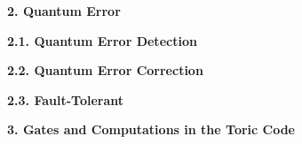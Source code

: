 \documentclass[12pt]{report}
\begin{document}
	\begin{minipage}{1 \textwidth}
		
		\textbf{2. Quantum Error}\newline
		
		\textbf{2.1. Quantum Error Detection}\newline
		
		\textbf{2.2. Quantum Error Correction}\newline
		
		\textbf{2.3. Fault-Tolerant}\newline \newline 
		
		\textbf{3. Gates and Computations in the Toric Code}\newline 
		
		
	\end{minipage}
	











 
	
\end{document}
